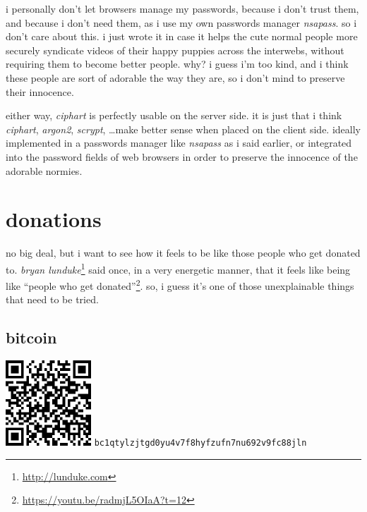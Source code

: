 \documentclass[twocolumn]{article}
\begin{document}
i personally don't let browsers manage my passwords, because i don't trust
them, and because i don't need them, as i use my own passwords manager
\emph{nsapass}.  so i don't care about this.  i just wrote it in case it
helps the cute normal people more securely syndicate videos of their happy
puppies across the interwebs, without requiring them to become better
people.  why?  i guess i'm too kind, and i think these people are sort of
adorable the way they are, so i don't mind to preserve their innocence.

either  way, \emph{ciphart} is perfectly usable on the server side.  it is
just that i think \emph{ciphart}, \emph{argon2}, \emph{scrypt}, \ldots make
better sense when placed on the client side.  ideally implemented in a
passwords manager like \emph{nsapass} as i said earlier, or integrated into
the password fields of web browsers in order to preserve the innocence of
the adorable normies.

\vfill
\break
\appendix
\section{donations}
no big deal, but i want to see how it feels to be like those people who get
donated to.  \emph{bryan lunduke}\footnote{\url{http://lunduke.com}} said
once, in a very energetic manner, that it feels like being like ``people
who get donated''\footnote{\url{https://youtu.be/radmjL5OIaA?t=12}}.  so, i
guess it's one of those unexplainable things that need to be tried.

\subsection{bitcoin}
\begin{center}
    \includegraphics[width=121px]{./pics/btc_wallet_address_trimmed.png}
    \texttt{bc1qtylzjtgd0yu4v7f8hyfzufn7nu692v9fc88jln}
\end{center}
\end{document}
